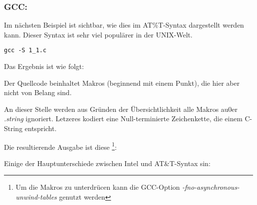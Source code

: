 \subsubsection{GCC: \ATTSyntax}
\label{ATT_syntax}

Im nächsten Beispiel ist sichtbar, wie dies im AT\%T-Syntax dargestellt werden kann.
Dieser Syntax ist sehr viel populärer in der UNIX-Welt.

\begin{lstlisting}[caption=Das Beispiel kompiliert mit GCC 4.7.3]
gcc -S 1_1.c
\end{lstlisting}

Das Ergebnis ist wie folgt:



Der Quellcode beinhaltet Makros (beginnend mit einem Punkt), die hier aber nicht von Belang sind.

An dieser Stelle werden aus Gründen der Übersichtlichkeit alle Makros au0er \emph{.string}
ignoriert. Letzeres kodiert eine Null-terminierte Zeichenkette, die einem C-String entspricht.

Die resultierende Ausgabe ist diese
\footnote{Um die  Makros zu unterdrücen kann die GCC-Option \emph{-fno-asynchronous-unwind-tables} genutzt werden}:



\myindex{\ATTSyntax}
\myindex{\IntelSyntax}
Einige der Hauptunterschiede zwischen Intel und AT\&T-Syntax sin:

